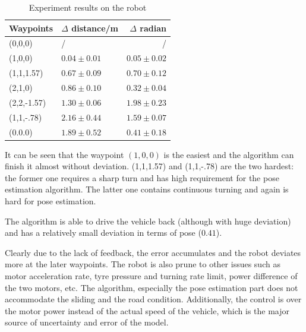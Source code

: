 \documentclass[12pt]{article}
\begin{document}
\begin{table}[!h]
\centering
\caption{Experiment results on the robot}
\label{tab1}
\begin{tabular}{llr}

Waypoints   & $\Delta$ distance/m& $\Delta$ radian  \\
\hline
(0,0,0)        &/        &/\\
(1,0,0)      & $0.04 \pm 0.01$  &  $0.05 \pm 0.02$\\
(1,1,1.57)     &   $0.67 \pm 0.09$    & $0.70 \pm 0.12$\\
(2,1,0)  &    $0.86 \pm 0.10$    &  $0.32 \pm 0.04$\\
(2,2,-1.57)       &   $1.30 \pm 0.06$     &      $1.98 \pm 0.23$\\
(1,1,-.78)        &    $2.16 \pm 0.44$        &    $1.59 \pm 0.07$\\
(0.0.0)       &   $1.89 \pm 0.52$         &   $0.41 \pm 0.18$\\
\hline
\end{tabular}
\end{table}
It can be seen that the waypoint $(1,0,0)$ is the easiest and the algorithm can finish it almost without deviation. (1,1,1.57) and (1,1,-.78) are the two hardest: the former one requires a sharp turn and has high requirement for the pose estimation algorithm. The latter one contains continuous turning and again is hard for pose estimation.

The algorithm is able to drive the vehicle back (although with huge deviation) and has a relatively small deviation in terms of pose ($0.41$).

Clearly due to the lack of feedback, the error accumulates and the robot deviates more at the later waypoints. The robot is also prune to other issues such as motor acceleration rate, tyre pressure and turning rate limit, power difference of the two motors, etc. The algorithm, especially the pose estimation part does not accommodate the sliding and the road condition. Additionally, the control is over the motor power instead of the actual speed of the vehicle, which is the major source of uncertainty and error of the model.





\end{document}
